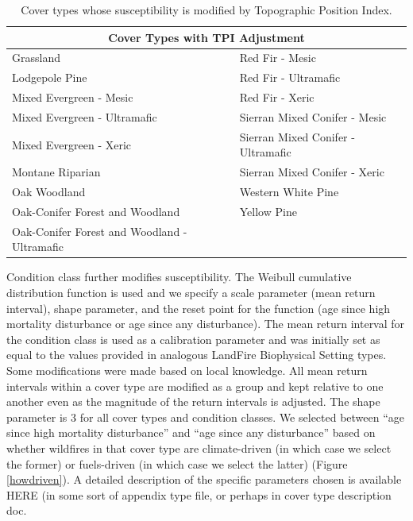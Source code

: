 \begin{itemize}
\begin{table}[htbp]
\small
\centering
\caption{Cover types whose susceptibility is modified by Topographic Position Index.}
\label{covtpi}
\begin{tabular}{ll}
\hline
\multicolumn{2}{c}{\textbf{Cover Types with TPI Adjustment}} \\
\hline
Grassland     									& Red Fir - Mesic   					\\
Lodgepole Pine    								& Red Fir - Ultramafic					\\
Mixed Evergreen - Mesic							& Red Fir - Xeric    					\\
Mixed Evergreen - Ultramafic     				& Sierran Mixed Conifer - Mesic    		\\
Mixed Evergreen - Xeric 						& Sierran Mixed Conifer - Ultramafic 	\\
Montane Riparian								& Sierran Mixed Conifer - Xeric 		\\
Oak Woodland 									& Western White Pine					\\
Oak-Conifer Forest and Woodland 				& Yellow Pine 							\\
Oak-Conifer Forest and Woodland - Ultramafic 	&										\\
\hline
\end{tabular}

\end{table}

Condition class further modifies susceptibility. The Weibull cumulative distribution function is used and we specify a scale parameter (mean return interval), shape parameter, and the reset point for the function (age since high mortality disturbance or age since any disturbance). The mean return interval for the condition class is used as a calibration parameter and was initially set as equal to the values provided in analogous LandFire Biophysical Setting types. Some modifications were made based on local knowledge. All mean return intervals within a cover type are modified as a group and kept relative to one another even as the magnitude of the return intervals is adjusted. The shape parameter is 3 for all cover types and condition classes. We selected between ``age since high mortality disturbance'' and ``age since any disturbance'' based on whether wildfires in that cover type are climate-driven (in which case we select the former) or fuels-driven (in which case we select the latter) (Figure \ref{howdriven}). A detailed description of the specific parameters chosen is available HERE (in some sort of appendix type file, or perhaps in cover type description doc.


\end{itemize}
